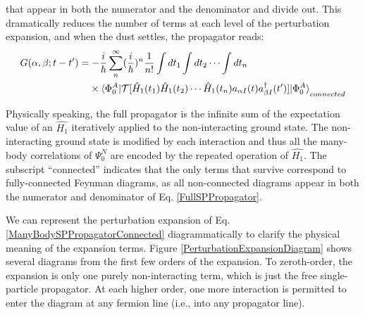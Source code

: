 that appear in both the numerator and the denominator and divide out. This dramatically
reduces the number of terms at each level of the perturbation expansion, and when the dust settles,
the propagator reads:
\begin{equation} \label{ManyBodySPPropagatorConnected}
    \begin{split}
    G(\alpha, \beta; t-t') & =
    -\frac{i}{\hbar}\sum^{\infty}_{n}(\frac{i}{\hbar})^{n}
    \frac{1}{n!}\int dt_{1} \int dt_{2} \cdots \int dt_{n}\\
    & \phantom{ {}= } \times \braket{\Phi^{A}_{0}|
    \mathcal{T}[\hat{H}_{1}(t_{1})
    \hat{H}_{1}(t_{2}) \cdots \hat{H}_{1}(t_{n})a_{{\alpha}I}(t)a^{\dagger}_{{\beta}I}(t')]|\Phi^{A}_{0}}_{connected}
\end{split}
\end{equation}

Physically speaking, the full propagator is the infinite sum of the expectation value of 
an $\hat{H_{1}}$ iteratively applied to the non-interacting ground state. The
non-interacting ground state is modified by each interaction and thus all the many-body correlations
of $\Psi^{N}_{0}$ are encoded by the repeated operation of $\hat{H_{1}}$. The subscript
``connected'' indicates that the only terms that survive correspond to fully-connected Feynman 
diagrams, as all non-connected diagrams appear in both the numerator and denominator of Eq. 
\ref{FullSPPropagator}.

We can represent the perturbation expansion of Eq. \ref{ManyBodySPPropagatorConnected}
diagrammatically to clarify the physical meaning of the expansion terms. Figure
\ref{PerturbationExpansionDiagram} shows several diagrams from the first few orders of the
expansion. To zeroth-order, 
the expansion is only one purely non-interacting term, which is just the free single-particle 
propagator. At each higher order, one more interaction is permitted to enter the diagram at any
fermion line (i.e., into any propagator line).



